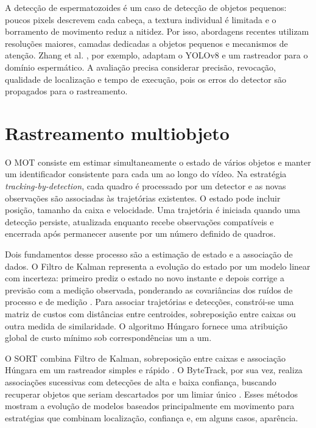 A detecção de espermatozoides é um caso de detecção de objetos pequenos: poucos pixels descrevem cada cabeça, a textura individual é limitada e o borramento de movimento reduz a nitidez. Por isso, abordagens recentes utilizam resoluções maiores, camadas dedicadas a objetos pequenos e mecanismos de atenção. Zhang et al. \cite{zhang2024spermyolo}, por exemplo, adaptam o YOLOv8 e um rastreador para o domínio espermático. A avaliação precisa considerar precisão, revocação, qualidade de localização e tempo de execução, pois os erros do detector são propagados para o rastreamento.

\section{Rastreamento multiobjeto}

O \ac{MOT} consiste em estimar simultaneamente o estado de vários objetos e manter um identificador consistente para cada um ao longo do vídeo. Na estratégia \textit{tracking-by-detection}, cada quadro é processado por um detector e as novas observações são associadas às trajetórias existentes. O estado pode incluir posição, tamanho da caixa e velocidade. Uma trajetória é iniciada quando uma detecção persiste, atualizada enquanto recebe observações compatíveis e encerrada após permanecer ausente por um número definido de quadros.

Dois fundamentos desse processo são a estimação de estado e a associação de dados. O Filtro de Kalman representa a evolução do estado por um modelo linear com incerteza: primeiro prediz o estado no novo instante e depois corrige a previsão com a medição observada, ponderando as covariâncias dos ruídos de processo e de medição \cite{kalman1960filter}. Para associar trajetórias e detecções, constrói-se uma matriz de custos com distâncias entre centroides, sobreposição entre caixas ou outra medida de similaridade. O algoritmo Húngaro fornece uma atribuição global de custo mínimo sob correspondências um a um.

O SORT combina Filtro de Kalman, sobreposição entre caixas e associação Húngara em um rastreador simples e rápido \cite{bewley2016sort}. O ByteTrack, por sua vez, realiza associações sucessivas com detecções de alta e baixa confiança, buscando recuperar objetos que seriam descartados por um limiar único \cite{zhang2022bytetrack}. Esses métodos mostram a evolução de modelos baseados principalmente em movimento para estratégias que combinam localização, confiança e, em alguns casos, aparência.

